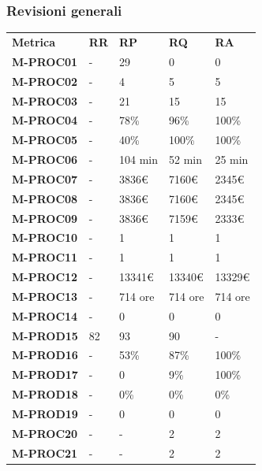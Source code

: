 \subsubsection{Revisioni generali}\mbox{}
\begin{longtable} {						
		>{}p{30mm}  		
		>{}p{15mm}		
		>{}p{15mm}		
		>{}p{15mm}		
		>{}p{15mm}						
	}			
	\rowcolor{gray!50}
	\textbf{Metrica} & \textbf{RR} & \textbf{RP} & \textbf{RQ} & \textbf{RA} \TBstrut \\ [2mm]
	\textbf{M-PROC01} & - & 29 & 0 & 0 \TBstrut \\ [2mm]
	\textbf{M-PROC02} & - & 4 & 5 & 5 \TBstrut \\ [2mm]
	\textbf{M-PROC03} & - & 21 & 15 & 15 \TBstrut \\ [2mm]
	\textbf{M-PROC04} & - & 78\% & 96\% & 100\% \TBstrut \\ [2mm]
	\textbf{M-PROC05} & - & 40\% & 100\% & 100\% \TBstrut \\ [2mm]
	\textbf{M-PROC06} & - & 104 min & 52 min & 25 min \TBstrut \\ [2mm]
	\textbf{M-PROC07} & - & 3836\euro & 7160\euro & 2345\euro \TBstrut \\ [2mm]
	\textbf{M-PROC08} & - & 3836\euro & 7160\euro & 2345\euro \TBstrut \\ [2mm]
	\textbf{M-PROC09} & - & 3836\euro & 7159\euro & 2333\euro \TBstrut \\ [2mm]
	\textbf{M-PROC10} & - & 1 & 1 & 1 \TBstrut \\ [2mm]
	\textbf{M-PROC11} & - & 1 & 1 & 1 \TBstrut \\ [2mm]
	\textbf{M-PROC12} & - & 13341\euro & 13340\euro & 13329\euro \TBstrut \\ [2mm]
	\textbf{M-PROC13} & - & 714 ore & 714 ore & 714 ore \TBstrut \\ [2mm]
	\textbf{M-PROC14} & - & 0 & 0 & 0 \TBstrut \\ [2mm]	
	\textbf{M-PROD15} & 82 & 93 & 90 & - \TBstrut \\ [2mm]
	\textbf{M-PROD16} & - & 53\% & 87\% & 100\% \TBstrut \\ [2mm]
	\textbf{M-PROD17} & - & 0 & 9\% & 100\% \TBstrut \\ [2mm]
	\textbf{M-PROD18} & - & 0\% & 0\% & 0\% \TBstrut \\ [2mm]
	\textbf{M-PROD19} & - & 0 & 0 & 0 \TBstrut \\ [2mm]
	\textbf{M-PROC20} & - & - & 2 & 2 \TBstrut \\ [2mm]
	\textbf{M-PROC21} & - & - & 2 & 2 \TBstrut \\ [2mm]

\end{longtable}
